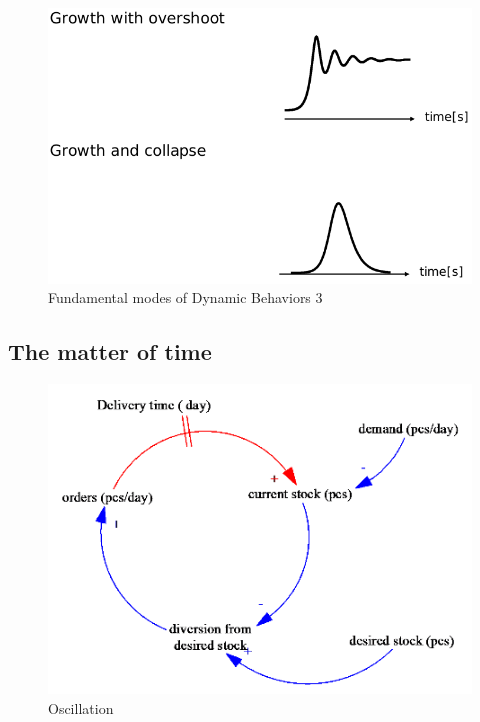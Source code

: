 \begin{figure}
\centering
\includegraphics{figures/fundamentalModesDynamicBehavior3.png}
\caption{Fundamental modes of Dynamic Behaviors 3}
\end{figure}

\hypertarget{the-matter-of-time}{%
\subsection{The matter of time}\label{the-matter-of-time}}

\begin{figure}
\centering
\includegraphics{figures/oscillationDelay.png}
\caption{Oscillation}
\end{figure}
